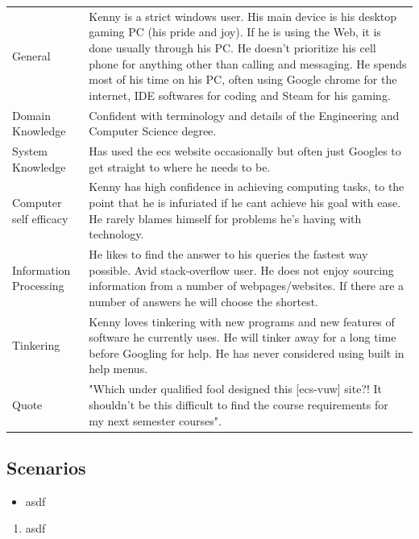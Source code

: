 \begin{tabularx}{\textwidth}{l X}
General & Kenny is a strict windows user. His main device is his desktop gaming PC (his pride and joy). If he is using the Web, it is done usually through his PC. He doesn't prioritize his cell phone for anything other than calling and messaging.  He spends most of his time on his PC, often using Google chrome for the internet, IDE softwares for coding and Steam for his gaming. \\

Domain Knowledge& Confident with terminology and details of the Engineering and Computer Science degree.\\

System Knowledge& Has used the ecs website occasionally but often just Googles to get straight to where he needs to be. \\

Computer self efficacy& Kenny has high confidence in achieving computing tasks, to the point that he is infuriated if he cant achieve his goal with ease. He rarely blames himself for problems he's having with technology. \\

Information Processing& He likes to find the answer to his queries the fastest way possible. Avid stack-overflow user. He does not enjoy sourcing information from a number of webpages/websites. If there are a number of answers he will choose the shortest.\\

Tinkering& Kenny loves tinkering with new programs and new features of software he currently uses. He will tinker away for a long time before Googling for help. He has never considered using built in help menus. \\

Quote& "Which under qualified fool designed this [ecs-vuw] site?! It shouldn't be this difficult to find the course requirements for my next semester courses".
\end{tabularx}

\pagebreak

\subsection{Scenarios}

\begin{itemize}
	\item asdf
\end{itemize}

\begin{enumerate}
	\item asdf
\end{enumerate}
